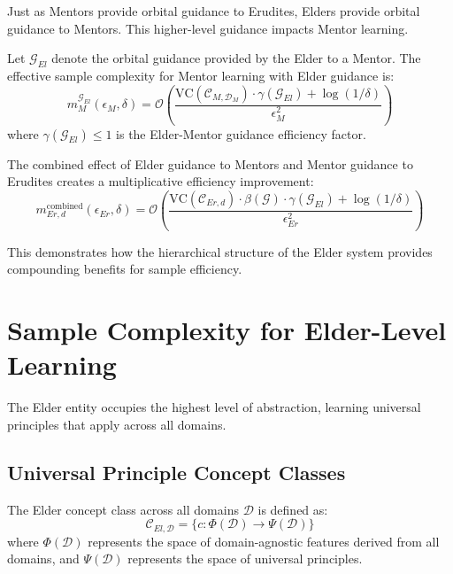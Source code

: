 Just as Mentors provide orbital guidance to Erudites, Elders provide orbital guidance to Mentors. This higher-level guidance impacts Mentor learning.

\begin{theorem}
Let $\mathcal{G}_{El}$ denote the orbital guidance provided by the Elder to a Mentor. The effective sample complexity for Mentor learning with Elder guidance is:
\begin{equation}
m_{M}^{\mathcal{G}_{El}}(\epsilon_{M}, \delta) = \mathcal{O}\left(\frac{\text{VC}(\mathcal{C}_{M,\mathcal{D}_M}) \cdot \gamma(\mathcal{G}_{El}) + \log(1/\delta)}{\epsilon_{M}^2}\right)
\end{equation}
where $\gamma(\mathcal{G}_{El}) \leq 1$ is the Elder-Mentor guidance efficiency factor.
\end{theorem}

\begin{corollary}
The combined effect of Elder guidance to Mentors and Mentor guidance to Erudites creates a multiplicative efficiency improvement:
\begin{equation}
m_{Er,d}^{\text{combined}}(\epsilon_{Er}, \delta) = \mathcal{O}\left(\frac{\text{VC}(\mathcal{C}_{Er,d}) \cdot \beta(\mathcal{G}) \cdot \gamma(\mathcal{G}_{El}) + \log(1/\delta)}{\epsilon_{Er}^2}\right)
\end{equation}
\end{corollary}

This demonstrates how the hierarchical structure of the Elder system provides compounding benefits for sample efficiency.

\section{Sample Complexity for Elder-Level Learning}

The Elder entity occupies the highest level of abstraction, learning universal principles that apply across all domains.

\subsection{Universal Principle Concept Classes}

\begin{definition}
The Elder concept class across all domains $\mathcal{D}$ is defined as:
\begin{equation}
\mathcal{C}_{El,\mathcal{D}} = \{c: \Phi(\mathcal{D}) \rightarrow \Psi(\mathcal{D})\}
\end{equation}
where $\Phi(\mathcal{D})$ represents the space of domain-agnostic features derived from all domains, and $\Psi(\mathcal{D})$ represents the space of universal principles.
\end{definition}

